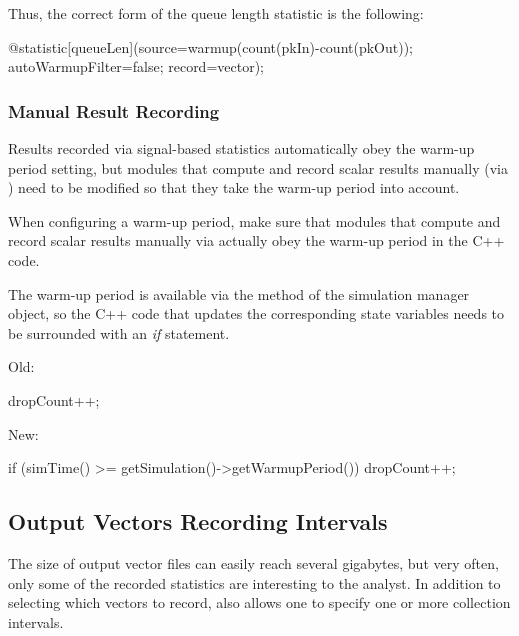 Thus, the correct form of the queue length statistic is the following:

\begin{ned}
@statistic[queueLen](source=warmup(count(pkIn)-count(pkOut));
                     autoWarmupFilter=false;
                     record=vector);
\end{ned}


\subsubsection{Manual Result Recording}
\label{sec:ana-sim:warmup-period-manual-result-recording}

Results recorded via signal-based statistics automatically obey the warm-up
period setting, but modules that compute and record scalar results manually (via
) need to be modified so that they take the warm-up period
into account.

\begin{note}
When configuring a warm-up period, make sure that modules that compute and
record scalar results manually via  actually obey the
warm-up period in the C++ code.
\end{note}

The warm-up period is available via the  method of the
simulation manager object, so the C++ code that updates the corresponding state
variables needs to be surrounded with an \textit{if} statement.

Old:

\begin{cpp}
dropCount++;
\end{cpp}

New:

\begin{cpp}
if (simTime() >= getSimulation()->getWarmupPeriod())
    dropCount++;
\end{cpp}


\subsection{Output Vectors Recording Intervals}
\label{sec:ana-sim:vector-recording-intervals}

The size of output vector files can easily reach several gigabytes, but very
often, only some of the recorded statistics are interesting to the analyst. In
addition to selecting which vectors to record, {\opp} also allows one to specify
one or more collection intervals.

